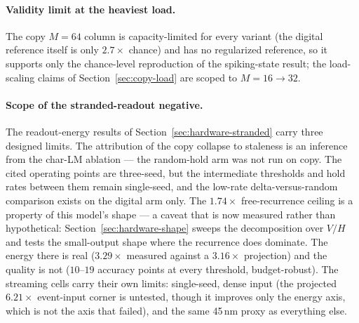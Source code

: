 \paragraph{Validity limit at the heaviest load.}
The copy $M{=}64$ column is capacity-limited for every variant (the digital reference
itself is only $2.7\times$ chance) and has no regularized reference, so it supports only
the chance-level reproduction of the spiking-state result; the load-scaling claims of
Section~\ref{sec:copy-load} are scoped to $M{=}16\!\to\!32$.

\paragraph{Scope of the stranded-readout negative.}
The readout-energy results of Section~\ref{sec:hardware-stranded} carry three designed
limits. The attribution of the copy collapse to staleness is an inference from the
char-LM ablation --- the random-hold arm was not run on copy. The cited operating points
are three-seed, but the intermediate thresholds and hold rates between them remain
single-seed, and the low-rate delta-versus-random comparison exists on the digital arm
only. The $1.74\times$ free-recurrence ceiling is a property of this model's shape ---
a caveat that is now measured rather than hypothetical: Section~\ref{sec:hardware-shape}
sweeps the decomposition over $V/H$ and tests the small-output shape where the recurrence
does dominate. The energy there is real ($3.29\times$ measured against a $3.16\times$
projection) and the quality is not ($10$--$19$ accuracy points at every threshold,
budget-robust). The streaming cells carry their own limits: single-seed, dense input
(the projected $6.21\times$ event-input corner is untested, though it improves only the
energy axis, which is not the axis that failed), and the same 45\,nm proxy as everything
else.
